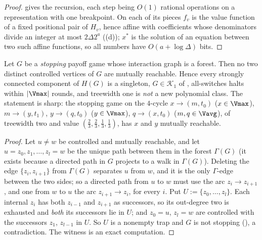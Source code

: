 \begin{proof}
 gives the recursion, each step being $O(1)$ rational
operations on a representation with one breakpoint. On each of its pieces $f_v$
is the value function of a fixed positional pair of $H_v$, hence affine with
coefficients whose denominators divide an integer at most $2\Delta2^{a}$
((d)); $x^{\ast}$ is the solution of an equation
between two such affine functions, so all numbers have $O(a+\log\Delta)$ bits.
\end{proof}

\begin{proposition}\label{wa:forest-k1}
Let $G$ be a \emph{stopping} payoff game whose interaction graph is a forest.
Then no two distinct controlled vertices of $G$ are mutually reachable. Hence
every strongly connected component of $H(G)$ is a singleton,
$G\in\mathcal K_1$ of , all-switches halts within
$|\Vmax|$ rounds, and treewidth one is \emph{not} a new polynomial class. The
statement is sharp: the stopping game on the $4$-cycle
$x\to(m,t_0)$ ($x\in\Vmax$), $m\to(y,t_1)$, $y\to(q,t_0)$ ($y\in\Vmax$),
$q\to(x,t_0)$ ($m,q\in\Vavg$), of treewidth two and value
$(\tfrac23,\tfrac23,\tfrac13,\tfrac13)$, has $x$ and $y$ mutually reachable.
\end{proposition}

\begin{proof}
Let $u\ne w$ be controlled and mutually reachable, and let
$u=z_0,z_1,\dots,z_l=w$ be the unique path between them in the forest
$\Gamma(G)$ (it exists because a directed path in $G$ projects to a walk in
$\Gamma(G)$). Deleting the edge $\{z_i,z_{i+1}\}$ from $\Gamma(G)$ separates $u$
from $w$, and it is the only $\Gamma$-edge between the two sides; so a directed
path from $u$ to $w$ must use the arc $z_i\to z_{i+1}$, and one from $w$ to $u$
the arc $z_{i+1}\to z_i$, for every $i$. Put $U:=\{z_0,\dots,z_l\}$. Each
internal $z_i$ has both $z_{i-1}$ and $z_{i+1}$ as successors, so its
out-degree two is exhausted and \emph{both} its successors lie in $U$; and
$z_0=u$, $z_l=w$ are controlled with the successors $z_1$, $z_{l-1}$ in $U$. So
$U$ is a nonempty trap and $G$ is not stopping (), a
contradiction. The witness is an exact computation.
\end{proof}

